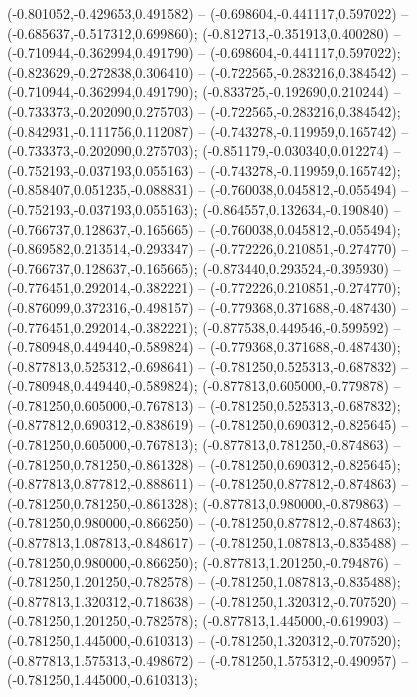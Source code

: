  (-0.801052,-0.429653,0.491582) -- (-0.698604,-0.441117,0.597022) -- (-0.685637,-0.517312,0.699860);
 (-0.812713,-0.351913,0.400280) -- (-0.710944,-0.362994,0.491790) -- (-0.698604,-0.441117,0.597022);
 (-0.823629,-0.272838,0.306410) -- (-0.722565,-0.283216,0.384542) -- (-0.710944,-0.362994,0.491790);
 (-0.833725,-0.192690,0.210244) -- (-0.733373,-0.202090,0.275703) -- (-0.722565,-0.283216,0.384542);
 (-0.842931,-0.111756,0.112087) -- (-0.743278,-0.119959,0.165742) -- (-0.733373,-0.202090,0.275703);
 (-0.851179,-0.030340,0.012274) -- (-0.752193,-0.037193,0.055163) -- (-0.743278,-0.119959,0.165742);
 (-0.858407,0.051235,-0.088831) -- (-0.760038,0.045812,-0.055494) -- (-0.752193,-0.037193,0.055163);
 (-0.864557,0.132634,-0.190840) -- (-0.766737,0.128637,-0.165665) -- (-0.760038,0.045812,-0.055494);
 (-0.869582,0.213514,-0.293347) -- (-0.772226,0.210851,-0.274770) -- (-0.766737,0.128637,-0.165665);
 (-0.873440,0.293524,-0.395930) -- (-0.776451,0.292014,-0.382221) -- (-0.772226,0.210851,-0.274770);
 (-0.876099,0.372316,-0.498157) -- (-0.779368,0.371688,-0.487430) -- (-0.776451,0.292014,-0.382221);
 (-0.877538,0.449546,-0.599592) -- (-0.780948,0.449440,-0.589824) -- (-0.779368,0.371688,-0.487430);
 (-0.877813,0.525312,-0.698641) -- (-0.781250,0.525313,-0.687832) -- (-0.780948,0.449440,-0.589824);
 (-0.877813,0.605000,-0.779878) -- (-0.781250,0.605000,-0.767813) -- (-0.781250,0.525313,-0.687832);
 (-0.877812,0.690312,-0.838619) -- (-0.781250,0.690312,-0.825645) -- (-0.781250,0.605000,-0.767813);
 (-0.877813,0.781250,-0.874863) -- (-0.781250,0.781250,-0.861328) -- (-0.781250,0.690312,-0.825645);
 (-0.877813,0.877812,-0.888611) -- (-0.781250,0.877812,-0.874863) -- (-0.781250,0.781250,-0.861328);
 (-0.877813,0.980000,-0.879863) -- (-0.781250,0.980000,-0.866250) -- (-0.781250,0.877812,-0.874863);
 (-0.877813,1.087813,-0.848617) -- (-0.781250,1.087813,-0.835488) -- (-0.781250,0.980000,-0.866250);
 (-0.877813,1.201250,-0.794876) -- (-0.781250,1.201250,-0.782578) -- (-0.781250,1.087813,-0.835488);
 (-0.877813,1.320312,-0.718638) -- (-0.781250,1.320312,-0.707520) -- (-0.781250,1.201250,-0.782578);
 (-0.877813,1.445000,-0.619903) -- (-0.781250,1.445000,-0.610313) -- (-0.781250,1.320312,-0.707520);
 (-0.877813,1.575313,-0.498672) -- (-0.781250,1.575312,-0.490957) -- (-0.781250,1.445000,-0.610313);
